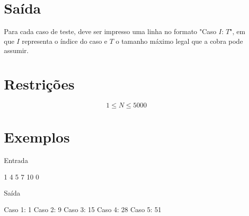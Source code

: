 \section*{Saída}

Para cada caso de teste, deve ser impresso uma linha no formato "Caso $I$: $T$", em que $I$ representa o índice do caso e $T$ o tamanho máximo legal que a cobra pode assumir.

\section*{Restrições}

$$1 \leq N \leq 5000$$

\section*{Exemplos}

Entrada

1
4
5
7
10
0

Saída

Caso 1: 1
Caso 2: 9
Caso 3: 15
Caso 4: 28
Caso 5: 51

\exemplo
